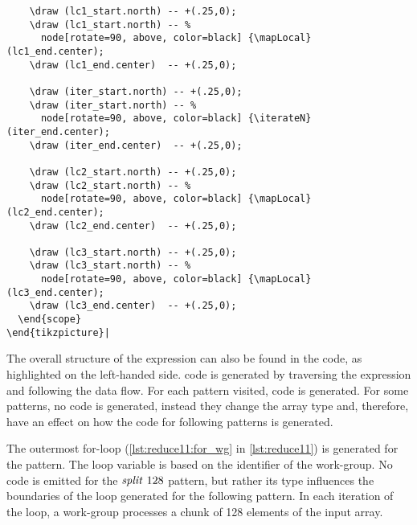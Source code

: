 \begin{lstlisting}
    \draw (lc1_start.north) -- +(.25,0);
    \draw (lc1_start.north) -- %
      node[rotate=90, above, color=black] {\mapLocal} (lc1_end.center);
    \draw (lc1_end.center)  -- +(.25,0);

    \draw (iter_start.north) -- +(.25,0);
    \draw (iter_start.north) -- %
      node[rotate=90, above, color=black] {\iterateN} (iter_end.center);
    \draw (iter_end.center)  -- +(.25,0);

    \draw (lc2_start.north) -- +(.25,0);
    \draw (lc2_start.north) -- %
      node[rotate=90, above, color=black] {\mapLocal} (lc2_end.center);
    \draw (lc2_end.center)  -- +(.25,0);

    \draw (lc3_start.north) -- +(.25,0);
    \draw (lc3_start.north) -- %
      node[rotate=90, above, color=black] {\mapLocal} (lc3_end.center);
    \draw (lc3_end.center)  -- +(.25,0);
  \end{scope}
\end{tikzpicture}|
\end{lstlisting}
%
The overall structure of the expression can also be found in the \OpenCL code, as highlighted on the left-handed side.
\OpenCL code is generated by traversing the expression and following the data flow.
For each pattern visited, \OpenCL code is generated.
For some patterns, no code is generated, instead they change the array type and, therefore, have an effect on how the code for following patterns is generated.

The outermost for-loop (\autoref{lst:reduce11:for_wg} in \autoref{lst:reduce11}) is generated for the \mapWorkgroup pattern.
The loop variable  is based on the identifier of the work-group.
No code is emitted for the $\splitN\ 128$ pattern, but rather its type influences the boundaries of the loop generated for the following \mapWorkgroup pattern. 
In each iteration of the loop, a work-group processes a chunk of 128 elements of the input array.

